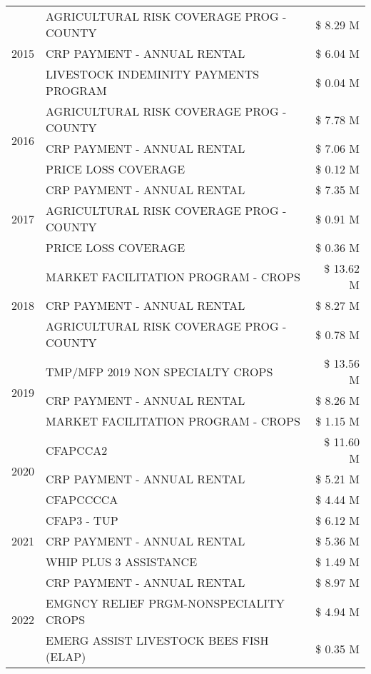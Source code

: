 \begin{tabular}{llr}
\multirow[t]{3}{*}{2015} & AGRICULTURAL RISK COVERAGE PROG - COUNTY & \$ 8.29 M \\
 & CRP PAYMENT - ANNUAL RENTAL & \$ 6.04 M \\
 & LIVESTOCK INDEMINITY PAYMENTS PROGRAM & \$ 0.04 M \\
\cline{1-3}
\multirow[t]{3}{*}{2016} & AGRICULTURAL RISK COVERAGE PROG - COUNTY & \$ 7.78 M \\
 & CRP PAYMENT - ANNUAL RENTAL & \$ 7.06 M \\
 & PRICE LOSS COVERAGE & \$ 0.12 M \\
\cline{1-3}
\multirow[t]{3}{*}{2017} & CRP PAYMENT - ANNUAL RENTAL & \$ 7.35 M \\
 & AGRICULTURAL RISK COVERAGE PROG - COUNTY & \$ 0.91 M \\
 & PRICE LOSS COVERAGE & \$ 0.36 M \\
\cline{1-3}
\multirow[t]{3}{*}{2018} & MARKET FACILITATION PROGRAM - CROPS & \$ 13.62 M \\
 & CRP PAYMENT - ANNUAL RENTAL & \$ 8.27 M \\
 & AGRICULTURAL RISK COVERAGE PROG - COUNTY & \$ 0.78 M \\
\cline{1-3}
\multirow[t]{3}{*}{2019} & TMP/MFP 2019 NON SPECIALTY CROPS & \$ 13.56 M \\
 & CRP PAYMENT - ANNUAL RENTAL & \$ 8.26 M \\
 & MARKET FACILITATION PROGRAM - CROPS & \$ 1.15 M \\
\cline{1-3}
\multirow[t]{3}{*}{2020} & CFAPCCA2 & \$ 11.60 M \\
 & CRP PAYMENT - ANNUAL RENTAL & \$ 5.21 M \\
 & CFAPCCCCA & \$ 4.44 M \\
\cline{1-3}
\multirow[t]{3}{*}{2021} & CFAP3 - TUP & \$ 6.12 M \\
 & CRP PAYMENT - ANNUAL RENTAL & \$ 5.36 M \\
 & WHIP PLUS 3 ASSISTANCE & \$ 1.49 M \\
\cline{1-3}
\multirow[t]{3}{*}{2022} & CRP PAYMENT - ANNUAL RENTAL & \$ 8.97 M \\
 & EMGNCY RELIEF PRGM-NONSPECIALITY CROPS & \$ 4.94 M \\
 & EMERG ASSIST LIVESTOCK BEES FISH (ELAP) & \$ 0.35 M \\
\cline{1-3}
\bottomrule
\end{tabular}
